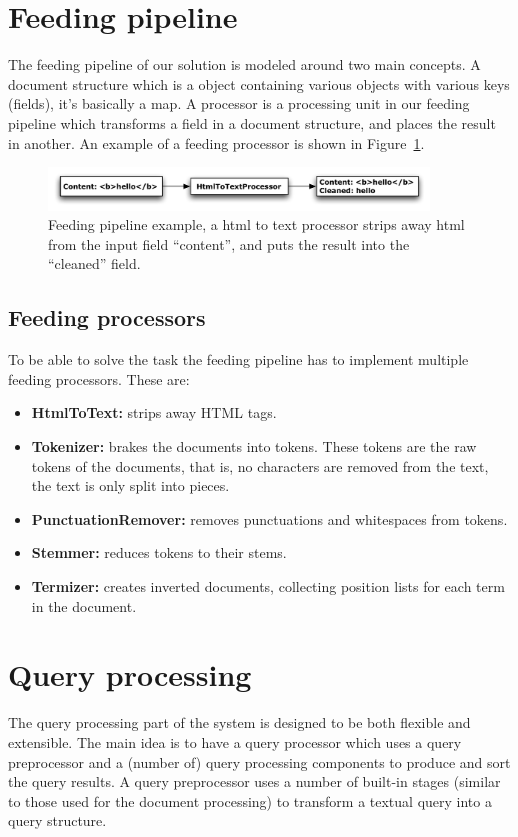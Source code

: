\section{Feeding pipeline}\label{sec:feeding_pipeline}
The feeding pipeline of our solution is modeled around two main concepts. A document structure which is a object containing various objects with various keys (fields), it's basically a map. A processor is a processing unit in our feeding pipeline which transforms a field in a document structure, and places the result in another. An example of a feeding processor is shown in Figure~\ref{fig:feeding_processor}.

\begin{figure}[htb]
	\centering
	\includegraphics[width=0.9\textwidth]{include/processor.pdf}
	\caption[Feeding pipeline example]{Feeding pipeline example, a html to text processor strips away html from the input field ``content'', and puts the result into the ``cleaned'' field.}\label{fig:feeding_processor}
\end{figure}

\subsection{Feeding processors}\label{sub:implemented_feeding_processors}
To be able to solve the task the feeding pipeline has to implement multiple feeding processors. These are:

\begin{itemize}
	\item \textbf{HtmlToText:} strips away HTML tags.
	\item \textbf{Tokenizer:} brakes the documents into tokens. These tokens are the raw tokens of the documents, that is, no characters are removed from the text, the text is only split into pieces.
	\item \textbf{PunctuationRemover:} removes punctuations and whitespaces from tokens. 
	\item \textbf{Stemmer:} reduces tokens to their stems. 
	\item \textbf{Termizer:} creates inverted documents, collecting position lists for each term in the document.
\end{itemize}

\section{Query processing}
The query processing part of the system is designed to be both flexible and extensible. The main idea is to have a query processor which uses a query preprocessor and a (number of) query processing components to produce and sort the query results. A query preprocessor uses a number of built-in stages (similar to those used for the document processing) to transform a textual query into a query structure.

